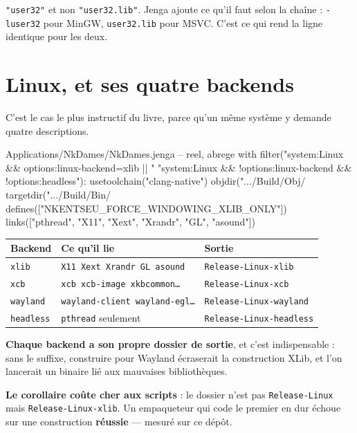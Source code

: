 \begin{nkretenir}
\texttt{"user32"} et non \texttt{"user32.lib"}. Jenga ajoute ce qu'il faut selon
la chaîne : \texttt{-luser32} pour MinGW, \texttt{user32.lib} pour MSVC. C'est ce
qui rend la ligne identique pour les deux.
\end{nkretenir}

\section{Linux, et ses quatre backends}

C'est le cas le plus instructif du livre, parce qu'un même système y demande
quatre descriptions.

\begin{nkcode}{Applications/NkDames/NkDames.jenga -- reel, abrege}
with filter("system:Linux && options:linux-backend=xlib || "
            "system:Linux && !options:linux-backend && !options:headless"):
    usetoolchain("clang-native")
    objdir(".../Build/Obj/%
    targetdir(".../Build/Bin/%
    defines(["NKENTSEU_FORCE_WINDOWING_XLIB_ONLY"])
    links(["pthread", "X11", "Xext", "Xrandr", "GL", "asound"])
\end{nkcode}

\begin{center}
\begin{tabular}{@{}lll@{}}
\toprule
\textbf{Backend} & \textbf{Ce qu'il lie} & \textbf{Sortie} \\
\midrule
\texttt{xlib} & \texttt{X11 Xext Xrandr GL asound} & \texttt{Release-Linux-xlib} \\
\texttt{xcb} & \texttt{xcb xcb-image xkbcommon\dots} & \texttt{Release-Linux-xcb} \\
\texttt{wayland} & \texttt{wayland-client wayland-egl\dots} & \texttt{Release-Linux-wayland} \\
\texttt{headless} & \texttt{pthread} seulement & \texttt{Release-Linux-headless} \\
\bottomrule
\end{tabular}
\end{center}

\begin{nkretenir}
\textbf{Chaque backend a son propre dossier de sortie}, et c'est indispensable :
sans le suffixe, construire pour Wayland écraserait la construction XLib, et
l'on lancerait un binaire lié aux mauvaises bibliothèques.

\alerte{} \textbf{Le corollaire coûte cher aux scripts} : le dossier n'est pas
\texttt{Release-Linux} mais \texttt{Release-Linux-xlib}. Un empaqueteur qui code
le premier en dur échoue sur une construction \textbf{réussie} --- mesuré sur ce
dépôt.
\end{nkretenir}

